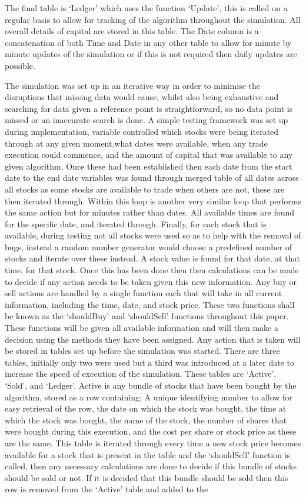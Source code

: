 \documentclass[conference]{IEEEtran}
\begin{document}
The final table is `Ledger' which uses the function `Update', this is called on a regular basis to allow for tracking of the algorithm throughout the simulation. All overall details of capital are stored in this table. The Date column is a concatenation of both Time and Date in any other table to allow for minute by minute updates of the simulation or if this is not required then daily updates are possible.

\iffalse
The simulation was set up in an iterative way in order to minimise the disruptions that missing data would cause, whilst also being exhaustive and searching for data given a reference point is straightforward, so no data point is missed or an inaccurate search is done. A simple testing framework was set up during implementation, variable controlled which stocks were being iterated through at any given moment,what dates were available, when any trade execution could commence, and the amount of capital that was available to any given algorithm. Once these had been established then each date from the start date to the end date variables was found through merged table of all dates across all stocks as some stocks are available to trade when others are not, these are then iterated through. Within this loop is another very similar loop that performs the same action but for minutes rather than dates. All available times are found for the specific date, and iterated through. Finally, for each stock that is available, during testing not all stocks were used so as to help with the removal of bugs, instead a random number generator would choose a predefined number of stocks and iterate over these instead. A stock value is found for that date, at that time, for that stock. Once this has been done then then calculations can be made to decide if any action needs to be taken given this new information. Any buy or sell actions are handled by a single function each that will take in all current information, including the time, date, and stock price. These two functions shall be known as the `shouldBuy' and `shouldSell' functions throughout this paper. These functions will be given all available information and will then make a decision using the methods they have been assigned. Any action that is taken will be stored in tables set up before the simulation was started. There are three tables, initially only two were used but a third was introduced at a later date to increase the speed of execution of the simulation. These tables are `Active', `Sold', and `Ledger'. Active is any bundle of stocks that have been bought by the algorithm, stored as a row containing; A unique identifying number to allow for easy retrieval of the row, the date on which the stock was bought, the time at which the stock was bought, the name of the stock, the number of shares that were bought during this execution, and the cost per share or stock price as these are the same. This table is iterated through every time a new stock price becomes available for a stock that is present in the table and the `shouldSell' function is called, then any necessary calculations are done to decide if this bundle of stocks should be sold or not. If it is decided that this bundle should be sold then this row is removed from the `Active' table and added to the 
\end{document}
